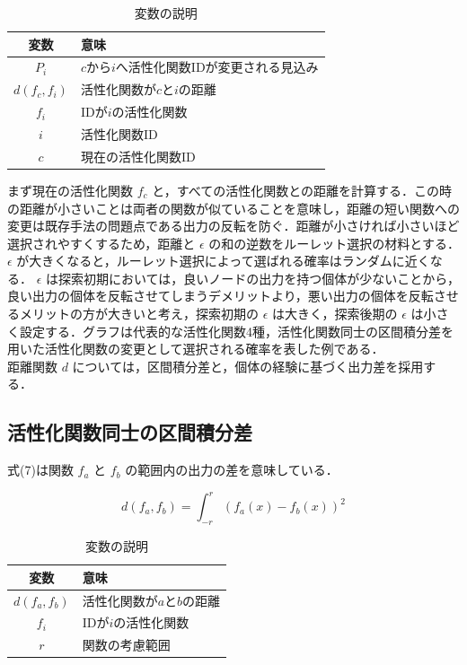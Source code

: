 \begin{table}[h]
    \caption{変数の説明}
    \centering
    \begin{tabular}{cl}
        \hline
        変数  & 意味 \\
        \hline \hline
        $P_{i}$               & $c$から$i$へ活性化関数IDが変更される見込み \\
        $d(f_{c}, f_{i})$     & 活性化関数が$c$と$i$の距離                 \\
        $f_{i}$               & IDが$i$の活性化関数                        \\
        $i$                   & 活性化関数ID                               \\
        $c$                   & 現在の活性化関数ID                         \\
        \hline
    \end{tabular}
\end{table}

まず現在の活性化関数 $ f_c $ と，すべての活性化関数との距離を計算する．この時の距離が小さいことは両者の関数が似ていることを意味し，距離の短い関数への変更は既存手法の問題点である出力の反転を防ぐ．距離が小さければ小さいほど選択されやすくするため，距離と $ \epsilon $ の和の逆数をルーレット選択の材料とする． $ \epsilon $ が大きくなると，ルーレット選択によって選ばれる確率はランダムに近くなる． $ \epsilon $ は探索初期においては，良いノードの出力を持つ個体が少ないことから，良い出力の個体を反転させてしまうデメリットより，悪い出力の個体を反転させるメリットの方が大きいと考え，探索初期の $ \epsilon $ は大きく，探索後期の $ \epsilon $ は小さく設定する．グラフは代表的な活性化関数4種，活性化関数同士の区間積分差を用いた活性化関数の変更として選択される確率を表した例である．\\
距離関数 $ d $ については，区間積分差と，個体の経験に基づく出力差を採用する．

\subsection{活性化関数同士の区間積分差}
式(7)は関数 $ f_a $ と $ f_b $ の範囲内の出力の差を意味している．

\begin{equation}
    d(f_{a}, f_{b}) = \int^{r}_{-r} (f_{a}(x) - f_{b}(x))^{2}
\end{equation}

\begin{table}[h]
    \caption{変数の説明}
    \centering
    \begin{tabular}{cl}
        \hline
        変数  & 意味 \\
        \hline \hline
        $d(f_{a}, f_{b})$ & 活性化関数が$a$と$b$の距離                 \\
        $f_{i}$           & IDが$i$の活性化関数                        \\
        $r$               & 関数の考慮範囲                             \\
        \hline
    \end{tabular}
\end{table}

